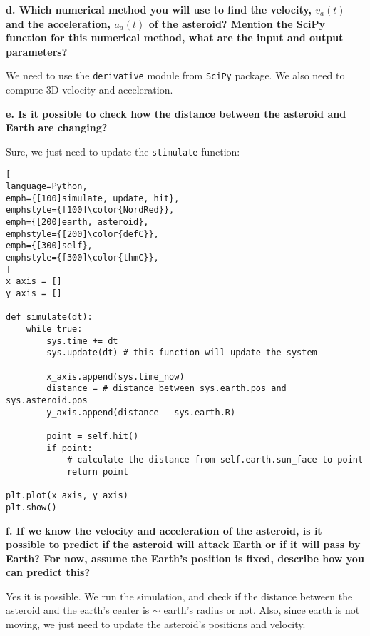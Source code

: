 \documentclass[article, 11pt, a4paper]{memoir}
\begin{document}
\textbf{d. Which numerical method you will use to find the velocity, $v_a(t)$ and the
acceleration, $a_a(t)$ of the asteroid? Mention the SciPy function for this numerical
method, what are the input and output parameters?}
\vspace{1em}

\begin{solution}
    [d]
    We need to use the \texttt{derivative} module from \texttt{SciPy} package. We also
    need to compute 3D velocity and acceleration.
\end{solution}

\textbf{e. Is it possible to check how the distance between the asteroid and Earth are
changing?}
\vspace{1em}

\begin{solution}
    Sure, we just need to update the \texttt{stimulate} function:
    
\begin{lstlisting}[
language=Python,
emph={[100]simulate, update, hit},
emphstyle={[100]\color{NordRed}},
emph={[200]earth, asteroid},
emphstyle={[200]\color{defC}},
emph={[300]self},
emphstyle={[300]\color{thmC}},
]
x_axis = []
y_axis = []

def simulate(dt):
    while true:
        sys.time += dt
        sys.update(dt) # this function will update the system
        
        x_axis.append(sys.time_now)
        distance = # distance between sys.earth.pos and sys.asteroid.pos
        y_axis.append(distance - sys.earth.R)

        point = self.hit()
        if point:
            # calculate the distance from self.earth.sun_face to point
            return point

plt.plot(x_axis, y_axis)
plt.show()
\end{lstlisting}
\end{solution}

\textbf{f. If we know the velocity and acceleration of the asteroid, is it possible to
predict if the asteroid will attack Earth or if it will pass by Earth? For now, assume the
Earth’s position is fixed, describe how you can predict this?}
\vspace{1em}

\begin{solution}
    [f]
    Yes it is possible. We run the simulation, and check if the distance between the
    asteroid and the earth's center is $\sim$ earth's radius or not. Also, since earth is
    not moving, we just need to update the asteroid's positions and velocity.
\end{solution}
\end{document}
